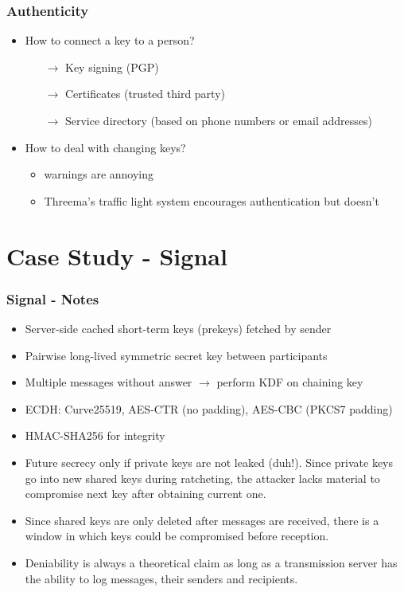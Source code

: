 \documentclass[
	aspectratio=169,
	xetex,
]{beamer}
\begin{document}
\begin{frame}
	\frametitle{Authenticity}
	\begin{itemize}
		\item How to connect a key to a person?
			\begin{itemize}
				\item[$\rightarrow$] Key signing (PGP)
				\item[$\rightarrow$] Certificates (trusted third party)
				\item[$\rightarrow$] Service directory (based on phone numbers or email addresses)
			\end{itemize}
		\item How to deal with changing keys?
			\begin{itemize}
				\item warnings are annoying
				\item Threema's traffic light system encourages authentication but doesn't 
			\end{itemize}

	\end{itemize}
\end{frame}

\section{Case Study - Signal}

\begin{frame}
	\frametitle{Signal - Notes}
	\begin{itemize}
		\item Server-side cached short-term keys (\alert{prekeys}) fetched by sender
		\item Pairwise long-lived symmetric secret key between participants
		\item Multiple messages without answer $\rightarrow$ perform KDF on \alert{chaining key}
		\item ECDH: Curve25519, AES-CTR (no padding), AES-CBC (PKCS7 padding)
		\item HMAC-SHA256 for integrity
		\item Future secrecy only if private keys are not leaked (duh!). Since private keys go into new shared keys during ratcheting, the attacker lacks material to compromise next key after obtaining current one.
		\item Since shared keys are only deleted after messages are received, there is a window in which keys could be compromised before reception. 
		\item Deniability is always a theoretical claim as long as a transmission server has the ability to log messages, their senders and recipients.

	\end{itemize}
\end{frame}
\end{document}
